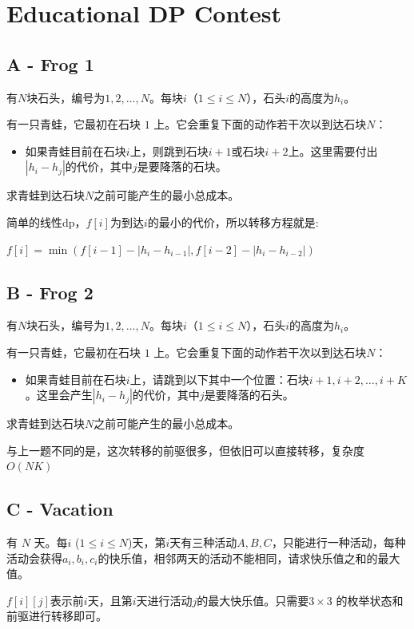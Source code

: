 \section{Educational DP Contest}

\subsection{A - Frog 1}
\begin{framed}
    有$N$块石头，编号为$1, 2, \ldots, N$。每块$i$（$1 \leq i \leq N$），石头$i$的高度为$h_i$。

    有一只青蛙，它最初在石块 $1$ 上。它会重复下面的动作若干次以到达石块$N$：
    \begin{itemize}
        \item 如果青蛙目前在石块$i$上，则跳到石块$i + 1$或石块$i + 2$上。这里需要付出$|h_i - h_j|$的代价，其中$j$是要降落的石块。
    \end{itemize}

    求青蛙到达石块$N$之前可能产生的最小总成本。
\end{framed}
简单的线性dp，$f[i]$为到达$i$的最小的代价，所以转移方程就是:

$f[i]=\min( f[i-1] - |h_i-h_{i-1}|,f[i-2]-|h_i-h_{i-2}|)$


\subsection{B - Frog 2}
\begin{framed}
    有$N$块石头，编号为$1, 2, \ldots, N$。每块$i$（$1 \leq i \leq N$），石头$i$的高度为$h_i$。

    有一只青蛙，它最初在石块 $1$ 上。它会重复下面的动作若干次以到达石块$N$：
    \begin{itemize}
        \item 如果青蛙目前在石块$i$上，请跳到以下其中一个位置：石块$i + 1, i + 2, \ldots, i + K$。这里会产生$|h_i - h_j|$的代价，其中$j$是要降落的石头。
    \end{itemize}
    求青蛙到达石块$N$之前可能产生的最小总成本。
\end{framed}
与上一题不同的是，这次转移的前驱很多，但依旧可以直接转移，复杂度$O(NK)$


\subsection{C - Vacation}
\begin{framed}
    有 $N$ 天。每$i$ ($1 \leq i \leq N$)天，第$i$天有三种活动$A,B,C$，只能进行一种活动，每种活动会获得$a_i,b_i,c_i$的快乐值，相邻两天的活动不能相同，请求快乐值之和的最大值。
\end{framed}
$f[i][j]$表示前$i$天，且第$i$天进行活动$j$的最大快乐值。只需要$3\times 3$ 的枚举状态和前驱进行转移即可。


